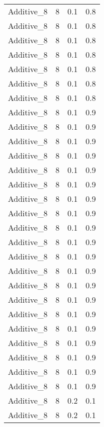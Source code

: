\documentclass{article}
\begin{document}
\begin{longtable}[H]{lrrr}
 Additive\_8 &       8 &   0.1 &            0.8 \\
 Additive\_8 &       8 &   0.1 &            0.8 \\
 Additive\_8 &       8 &   0.1 &            0.8 \\
 Additive\_8 &       8 &   0.1 &            0.8 \\
 Additive\_8 &       8 &   0.1 &            0.8 \\
 Additive\_8 &       8 &   0.1 &            0.8 \\
 Additive\_8 &       8 &   0.1 &            0.8 \\
 Additive\_8 &       8 &   0.1 &            0.9 \\
 Additive\_8 &       8 &   0.1 &            0.9 \\
 Additive\_8 &       8 &   0.1 &            0.9 \\
 Additive\_8 &       8 &   0.1 &            0.9 \\
 Additive\_8 &       8 &   0.1 &            0.9 \\
 Additive\_8 &       8 &   0.1 &            0.9 \\
 Additive\_8 &       8 &   0.1 &            0.9 \\
 Additive\_8 &       8 &   0.1 &            0.9 \\
 Additive\_8 &       8 &   0.1 &            0.9 \\
 Additive\_8 &       8 &   0.1 &            0.9 \\
 Additive\_8 &       8 &   0.1 &            0.9 \\
 Additive\_8 &       8 &   0.1 &            0.9 \\
 Additive\_8 &       8 &   0.1 &            0.9 \\
 Additive\_8 &       8 &   0.1 &            0.9 \\
 Additive\_8 &       8 &   0.1 &            0.9 \\
 Additive\_8 &       8 &   0.1 &            0.9 \\
 Additive\_8 &       8 &   0.1 &            0.9 \\
 Additive\_8 &       8 &   0.1 &            0.9 \\
 Additive\_8 &       8 &   0.1 &            0.9 \\
 Additive\_8 &       8 &   0.1 &            0.9 \\
 Additive\_8 &       8 &   0.2 &            0.1 \\
 Additive\_8 &       8 &   0.2 &            0.1 \\

\end{longtable}
\end{document}
